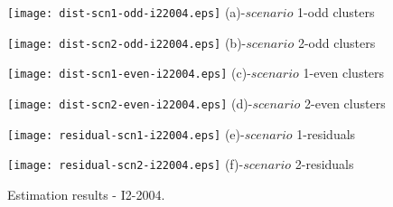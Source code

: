 \begin{figure}
     \begin{minipage}[h]{0.5\linewidth}
        \centering
        \texttt{[image: dist-scn1-odd-i22004.eps]}
				\footnotesize{(a)-$scenario$ 1-odd clusters}
     \end{minipage}
\vspace{3.00mm}
    \begin{minipage}[h]{0.5\linewidth}
       \centering
       \texttt{[image: dist-scn2-odd-i22004.eps]}
			\footnotesize{(b)-$scenario$ 2-odd clusters}
     \end{minipage}
\vspace{3.00mm}
    \begin{minipage}[h]{0.5\linewidth}
       \centering
       \texttt{[image: dist-scn1-even-i22004.eps]}
			\footnotesize{(c)-$scenario$ 1-even clusters}
     \end{minipage}
\vspace{3.00mm}
    \begin{minipage}[h]{0.5\linewidth}
       \centering
       \texttt{[image: dist-scn2-even-i22004.eps]}
			\footnotesize{(d)-$scenario$ 2-even clusters}
     \end{minipage}
\vspace{3.00mm}
    \begin{minipage}[h]{0.5\linewidth}
       \centering
       \texttt{[image: residual-scn1-i22004.eps]}
			\footnotesize{(e)-$scenario$ 1-residuals}
     \end{minipage}
\vspace{3.00mm}
    \begin{minipage}[h]{0.5\linewidth}
       \centering
       \texttt{[image: residual-scn2-i22004.eps]}
			\footnotesize{(f)-$scenario$ 2-residuals}
     \end{minipage}
		\caption{Estimation results - I2-2004.}
\label{fig8}
\end{figure}



